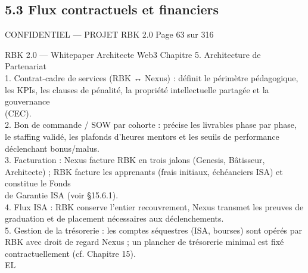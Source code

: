 \documentclass[12pt,landscape,a4paper]{article}
\newenvironment{confidential}
{\begin{tcolorbox}[
    colback=rbkred!5!white,
    colframe=rbkred!75!black,
    title=CONFIDENTIEL,
    fonttitle=\bfseries\color{white},
    coltitle=rbkred!75!black,
    breakable,
    enhanced,
    frame hidden,
    borderline west={2pt}{0pt}{rbkred!75!black}
]}
{\end{tcolorbox}}
\begin{document}
\subsection{5.3 Flux contractuels et financiers}
\vspace{0.5em}
\vspace{0.5em}
\vspace{0.5em}
\begin{confidential}CONFIDENTIEL — PROJET RBK 2.0                                               Page 63 sur 316\end{confidential}
RBK 2.0 — Whitepaper Architecte Web3                                                                                       Chapitre 5. Architecture de Partenariat\\
\vspace{0.5em}
\vspace{0.5em}
\vspace{0.5em}
1. Contrat-cadre de services (RBK ↔ Nexus) : définit le périmètre pédagogique, les KPIs, les clauses de pénalité, la propriété intellectuelle partagée et la gouvernance\\
(CEC).\\
2. Bon de commande / SOW par cohorte : précise les livrables phase par phase, le staffing validé, les plafonds d’heures mentors et les seuils de performance\\
déclenchant bonus/malus.\\
3. Facturation : Nexus facture RBK en trois jalons (Genesis, Bâtisseur, Architecte) ; RBK facture les apprenants (frais initiaux, échéanciers ISA) et constitue le Fonds\\
de Garantie ISA (voir §15.6.1).\\
4. Flux ISA : RBK conserve l’entier recouvrement, Nexus transmet les preuves de graduation et de placement nécessaires aux déclenchements.\\
5. Gestion de la trésorerie : les comptes séquestres (ISA, bourses) sont opérés par RBK avec droit de regard Nexus ; un plancher de trésorerie minimal est fixé\\
contractuellement (cf. Chapitre 15).\\
\vspace{0.5em}
\vspace{0.5em}
\vspace{0.5em}
\vspace{0.5em}
EL\\
\end{document}
